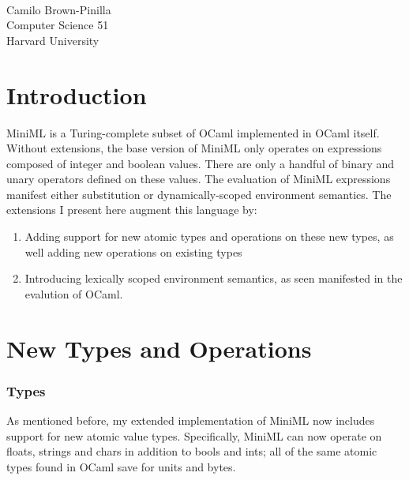 \documentclass[10pt,letterpaper]{article}
\begin{document}
\vspace*{0.35in}

\begin{flushleft}
{\Large
\textbf{}
}
\newline
\\
Camilo Brown-Pinilla
\\
Computer Science 51
\\
Harvard University

\end{flushleft}

\section*{Introduction}
MiniML is a Turing-complete subset of OCaml implemented in OCaml itself. Without extensions, the base version of MiniML only operates on expressions composed of integer and boolean values. There are only a handful of binary and unary operators defined on these values. The evaluation of MiniML expressions manifest either substitution or dynamically-scoped environment semantics. The extensions I present here augment this language by:
\begin{enumerate}
    \item Adding support for new atomic types and operations on these new types, as well adding new operations on existing types
    \item Introducing lexically scoped environment semantics, as seen manifested in the evalution of OCaml. 
\end{enumerate}


\section*{New Types and Operations}

\subsubsection*{Types}
As mentioned before, my extended implementation of MiniML now includes support for new atomic value types. Specifically, MiniML can now operate on floats, strings and chars in addition to bools and ints; all of the same atomic types found in OCaml save for units and bytes.  
\end{document}
